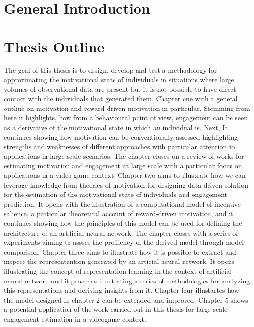 \section{General Introduction}
\lorem

\section{Thesis Outline}
The goal of this thesis is to design, develop and test a methodology for approximating the motivational state of individuals in situations where large volumes of observational data are present but it is not possible to have direct contact with the individuals that generated them. Chapter one with a general outline on motivation and reward-driven motivation in particular. Stemming from here it highlights, how from a behavioural point of view, engagement can be seen as a derivative of the motivational state in which an individual is. Next, It continues showing how motivation can be conventionally assessed highlighting strengths and weaknesses of different approaches with particular attention to applications in large scale scenarios. The chapter closes on a review of works for estimating motivation and engagement at large scale with a particular focus on applications in a video game context. Chapter two aims to illustrate how we can leverage knowledge from theories of motivation for designing data driven solution for the estimation of the motivational state of individuals and engagement prediction. It opens with the illustration of a computational model of incentive salience, a particular theoretical account of reward-driven motivation, and it continues showing how the principles of this model can be used for defining the architecture of an artificial neural network. The chapter closes with a series of experiments aiming to assses the profiiency of the derived model through model comparison. Chapter three aims to illustrate how it is possible to extract and inspect the representantion generated by an articial neural network. It opens illustrating the concept of representation learning in the context of artificial neural network and it proceeds illustrating a series of methodologies for analyzing this representations and deriving insights from it. Chapter four illustartes how the model designed in chapter 2 can be extended and improved. Chapter 5 shows a potential application of the work carried out in this thesis for large scale engagement estimation in a videogame context.


